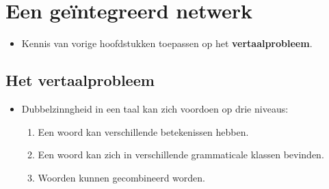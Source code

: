 \chapter{Een geïntegreerd netwerk}
\begin{itemize}
    \item Kennis van vorige hoofdstukken toepassen op het \textbf{vertaalprobleem}.
\end{itemize}

\section{Het vertaalprobleem}
\begin{itemize}
    \item Dubbelzinngheid in een taal kan zich voordoen op drie niveaus:
    \begin{enumerate}
        \item Een woord kan verschillende betekenissen hebben.
        \item Een woord kan zich in verschillende grammaticale klassen bevinden.
        \item Woorden kunnen gecombineerd worden.
    \end{enumerate}
\end{itemize}

